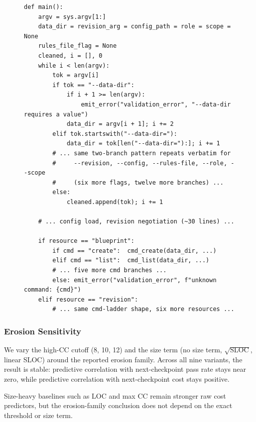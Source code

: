 \begin{figure}[h]
\begin{lstlisting}[caption={\texttt{main()} from Opus~4.7's \texttt{forge} solution at $\ckpt{8}$, abridged to expose structure. The \texttt{argparse} call has been removed; each of seven flags is handled by an identical pair of branches. After parsing, a nested \texttt{if resource == ...: if cmd == ...} ladder dispatches over seven resources.},label={lst:erosion-main-cp8}]
def main():
    argv = sys.argv[1:]
    data_dir = revision_arg = config_path = role = scope = None
    rules_file_flag = None
    cleaned, i = [], 0
    while i < len(argv):
        tok = argv[i]
        if tok == "--data-dir":
            if i + 1 >= len(argv):
                emit_error("validation_error", "--data-dir requires a value")
            data_dir = argv[i + 1]; i += 2
        elif tok.startswith("--data-dir="):
            data_dir = tok[len("--data-dir="):]; i += 1
        # ... same two-branch pattern repeats verbatim for
        #     --revision, --config, --rules-file, --role, --scope
        #     (six more flags, twelve more branches) ...
        else:
            cleaned.append(tok); i += 1

    # ... config load, revision negotiation (~30 lines) ...

    if resource == "blueprint":
        if cmd == "create":  cmd_create(data_dir, ...)
        elif cmd == "list":  cmd_list(data_dir, ...)
        # ... five more cmd branches ...
        else: emit_error("validation_error", f"unknown command: {cmd}")
    elif resource == "revision":
        # ... same cmd-ladder shape, six more resources ...
\end{lstlisting}
\end{figure}

\subsubsection{Erosion Sensitivity}\label{sec:erosion-sensitivity}

We vary the high-CC cutoff (8, 10, 12) and the size term (no size term, $\sqrt{\text{SLOC}}$, linear SLOC) around the reported erosion family. Across all nine variants, the result is stable: predictive correlation with next-checkpoint pass rate stays near zero, while predictive correlation with next-checkpoint cost stays positive.



Size-heavy baselines such as LOC and max CC remain stronger raw cost predictors, but the erosion-family conclusion does not depend on the exact threshold or size term.
